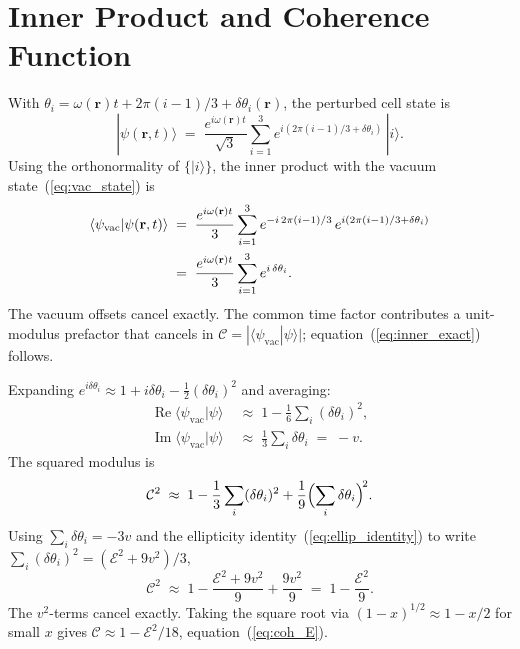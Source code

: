 \documentclass[a4paper,fleqn]{cas-dc}
\theoremstyle{thmstyleone}%
\theoremstyle{thmstyletwo}%
\begin{document}
\appendix
\section{Inner Product and Coherence Function}
\label{app:inner_product}

With $\theta_i = \omega(\mathbf{r})t + 2\pi(i-1)/3
+ \delta\theta_i(\mathbf{r})$, the perturbed cell state is
\begin{equation}
    |\psi(\mathbf{r},t)\rangle
    \;=\;
    \frac{e^{i\omega(\mathbf{r})t}}{\sqrt{3}}
    \sum_{i=1}^{3}e^{i(2\pi(i-1)/3+\delta\theta_i)}\,|i\rangle.
\end{equation}
Using the orthonormality of $\{|i\rangle\}$, the inner product
with the vacuum state~(\ref{eq:vac_state}) is
\begin{align}
    \langle\psi_{\mathrm{vac}}|\psi(\mathbf{r},t)\rangle
    &\;=\;
    \frac{e^{i\omega(\mathbf{r})t}}{3}\sum_{i=1}^{3}
    e^{-i\,2\pi(i-1)/3}\,e^{i(2\pi(i-1)/3+\delta\theta_i)}
    \notag\\
    &\;=\;
    \frac{e^{i\omega(\mathbf{r})t}}{3}\sum_{i=1}^{3}
    e^{i\,\delta\theta_i}.
    \label{eq:app_inner}
\end{align}
The vacuum offsets cancel exactly. The common time factor
contributes a unit-modulus prefactor that cancels in
$\mathcal{C}=|\langle\psi_{\mathrm{vac}}|\psi\rangle|$;
equation~(\ref{eq:inner_exact}) follows.

Expanding $e^{i\delta\theta_i}\approx 1+i\delta\theta_i
-\tfrac{1}{2}(\delta\theta_i)^2$ and averaging:
\begin{align}
    \operatorname{Re}\langle\psi_{\mathrm{vac}}|\psi\rangle
    &\;\approx\;
    1-\frac{1}{6}\sum_i(\delta\theta_i)^2,\\
    \operatorname{Im}\langle\psi_{\mathrm{vac}}|\psi\rangle
    &\;\approx\;
    \frac{1}{3}\sum_i\delta\theta_i\;=\;-v.
\end{align}
The squared modulus is
\begin{equation}
    \mathcal{C}^2
    \;\approx\;
    1-\frac{1}{3}\sum_i(\delta\theta_i)^2
    +\frac{1}{9}\Bigl(\sum_i\delta\theta_i\Bigr)^{\!2}.
\end{equation}
Using $\sum_i\delta\theta_i=-3v$ and the ellipticity
identity~(\ref{eq:ellip_identity}) to write
$\sum_i(\delta\theta_i)^2=(\mathcal{E}^2+9v^2)/3$,
\begin{equation}
    \mathcal{C}^2
    \;\approx\;
    1-\frac{\mathcal{E}^2+9v^2}{9}+\frac{9v^2}{9}
    \;=\;
    1-\frac{\mathcal{E}^2}{9}.
\end{equation}
The $v^2$-terms cancel exactly. Taking the square root via
$(1-x)^{1/2}\approx 1-x/2$ for small $x$ gives
$\mathcal{C}\approx 1-\mathcal{E}^2/18$,
equation~(\ref{eq:coh_E}).
\end{document}

